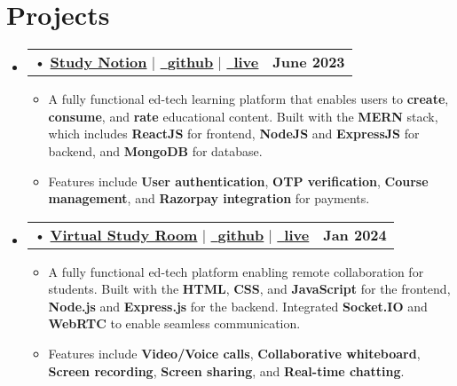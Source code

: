 \documentclass[letterpaper,11pt]{article}
\makeatletter
\newcommand{\resumeItem}[1]{
  \item\small{
	{#1 \vspace{-2pt}}
  }
}
\newcommand{\resumeProjectHeading}[2]{
	\item
	\begin{tabular*}{1.001\textwidth}{l@{\extracolsep{\fill}}r}
  	\small#1 & \textbf{\small #2}\\
	\end{tabular*}\vspace{-7pt}
}
\newcommand{\resumeSubHeadingListStart}{\begin{itemize}[leftmargin=0.0in, label={}]}
\newcommand{\resumeSubHeadingListEnd}{\end{itemize}}
\newcommand{\resumeItemListStart}{\begin{itemize}}
\newcommand{\resumeItemListEnd}{\end{itemize}\vspace{-5pt}}
\makeatother
\begin{document}
\section{Projects }
\begin{itemize}[leftmargin=0.12in, label={}]
	\vspace{-8pt}
	\resumeSubHeadingListStart
 
      \resumeProjectHeading
       {\hspace{-5pt}• {\href{https://studynotion-abhikant.vercel.app/}{\textbf{Study Notion}} } $|$  \href{https://github.com/abhikant12/Study-Notion}{\small \raisebox{-0.2\height}\faLink\  \underline{\textbf{github}}} $|$  \href{https://studynotion-abhikant.vercel.app/}{\small \raisebox{-0.2\height}\faLink\  \underline{\textbf{live}}} }{June 
        2023}
      	\resumeItemListStart
             \vspace{7pt}
        	\resumeItem{A fully functional ed-tech learning platform that enables users to \textbf{create}, \textbf{consume}, and \textbf{rate} educational content. Built with the \textbf{MERN} stack, which includes \textbf{ReactJS} for frontend, \textbf{NodeJS} and \textbf{ExpressJS} for backend, and \textbf{MongoDB} for database. }
          \vspace{4pt}
         \resumeItem{Features include \textbf{User authentication}, \textbf{OTP verification}, \textbf{Course management}, and \textbf{Razorpay integration} for payments.}
         
      	\resumeItemListEnd
        \vspace{-4pt}

     \resumeProjectHeading
       {\hspace{-5pt}• {\href{https://virtual-study-room.onrender.com/}{\textbf{Virtual Study Room}} } $|$  \href{https://github.com/abhikant12/Virtual-Study-Room.git}{\small \raisebox{-0.2\height}\faLink\  \underline{\textbf{github}}} $|$  \href{https://virtual-study-room.onrender.com/}{\small \raisebox{-0.2\height}\faLink\  \underline{\textbf{live}}} }{Jan 
        2024}
      	\resumeItemListStart
             \vspace{7pt}
             \resumeItem{A fully functional ed-tech platform enabling remote collaboration for students. Built with the \textbf{HTML}, \textbf{CSS}, and \textbf{JavaScript} for the frontend, \textbf{Node.js} and \textbf{Express.js} for the backend. Integrated \textbf{Socket.IO} and \textbf{WebRTC} to enable seamless communication.}
           \vspace{4pt}
             \resumeItem{Features include  \textbf{Video/Voice calls}, \textbf{Collaborative whiteboard}, \textbf{Screen recording}, \textbf{Screen sharing}, and \textbf{Real-time chatting}.}
             
      	\resumeItemListEnd
        \vspace{-5pt}
    
	\resumeSubHeadingListEnd
 \end{itemize} 
\vspace{-3pt}
  
\end{document}

